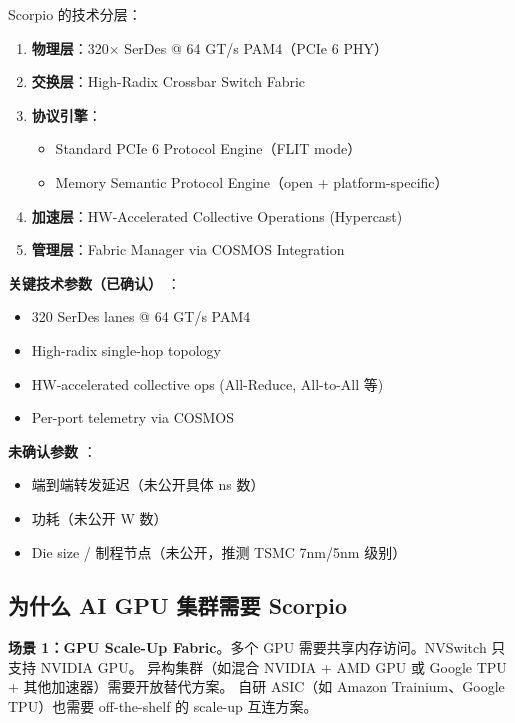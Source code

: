 Scorpio 的技术分层：

\begin{enumerate}
    \item \textbf{物理层}：320$\times$ SerDes @ 64 GT/s PAM4（PCIe 6 PHY）
    \item \textbf{交换层}：High-Radix Crossbar Switch Fabric
    \item \textbf{协议引擎}：
        \begin{itemize}
            \item Standard PCIe 6 Protocol Engine（FLIT mode）
            \item Memory Semantic Protocol Engine（open + platform-specific）
        \end{itemize}
    \item \textbf{加速层}：HW-Accelerated Collective Operations (Hypercast)
    \item \textbf{管理层}：Fabric Manager via COSMOS Integration
\end{enumerate}

\textbf{关键技术参数（已确认）} ：
\begin{itemize}
    \item 320 SerDes lanes @ 64 GT/s PAM4
    \item High-radix single-hop topology
    \item HW-accelerated collective ops (All-Reduce, All-to-All 等)
    \item Per-port telemetry via COSMOS
\end{itemize}

\textbf{未确认参数} \unverified{}：
\begin{itemize}
    \item 端到端转发延迟（未公开具体 ns 数）
    \item 功耗（未公开 W 数）
    \item Die size / 制程节点（未公开，推测 TSMC 7nm/5nm 级别）
\end{itemize}

\subsection{为什么 AI GPU 集群需要 Scorpio}

\textbf{场景 1：GPU Scale-Up Fabric}。多个 GPU 需要共享内存访问。NVSwitch 只支持 NVIDIA GPU。
异构集群（如混合 NVIDIA + AMD GPU 或 Google TPU + 其他加速器）需要开放替代方案。
自研 ASIC（如 Amazon Trainium、Google TPU）也需要 off-the-shelf 的 scale-up 互连方案。

